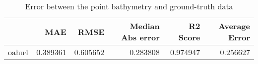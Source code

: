 \begin{table}[h!]
\centering
\caption{Error between the point bathymetry and ground-truth data}
\label{tab:oahu4_lidar_error}
\begin{tabular}{lrrrrr}
\toprule
 & MAE & RMSE & Median Abs error & R2 Score & Average Error \\
\midrule
oahu4 & 0.389361 & 0.605652 & 0.283808 & 0.974947 & 0.256627 \\
\bottomrule
\end{tabular}
\end{table}
